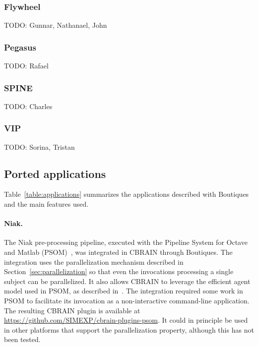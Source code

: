 \documentclass{article}
\newcommand{\todo}[1]{\color{red}TODO: #1\color{black}}
\begin{document}
\subsubsection{Flywheel}

\todo{Gunnar, Nathanael, John}

\subsubsection{Pegasus}

\todo{Rafael}

\subsubsection{SPINE}

\todo{Charles}

\subsubsection{VIP}

\todo{Sorina, Tristan}

\subsection{Ported applications}


Table~\ref{table:applications} summarizes the applications described
with Boutiques and the main features used.

\paragraph{Niak.} The Niak pre-processing pipeline, executed with the Pipeline System
for Octave and Matlab (PSOM)~\cite{bellec2012pipeline}, was integrated
in CBRAIN through Boutiques. The integration uses the parallelization
mechanism described in Section~\ref{sec:parallelization} so that even
the invocations processing a single subject can be parallelized. It also
allows CBRAIN to leverage the efficient agent model used in PSOM, as
described in~\cite{GLAT-16}. The integration required some work in
PSOM to facilitate its invocation as a non-interactive command-line
application. The resulting CBRAIN plugin is available at
\url{https://github.com/SIMEXP/cbrain-plugins-psom}. It could in
principle be used in other platforms that support the parallelization
property, although this has not been tested.
\end{document}
